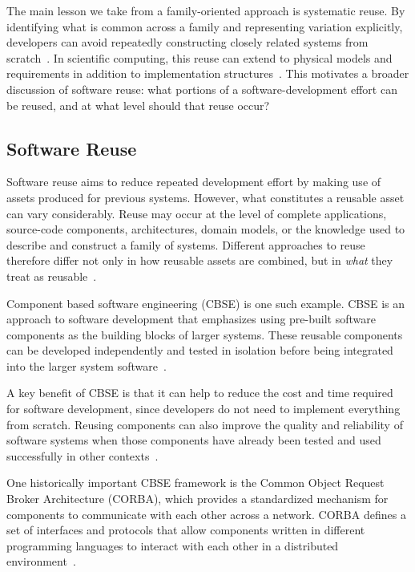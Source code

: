 The main lesson we take from a family-oriented approach is systematic reuse.
By identifying what is common across a family and
representing variation explicitly, developers can avoid repeatedly
constructing closely related systems from scratch~\citep{Pohl2005,Weiss1998}. In
scientific computing, this reuse can extend to physical models and requirements 
in addition to implementation 
structures~\citep{SmithMcCutchanAndCao2007,SmithEtAl2008}. This motivates a
broader discussion of software reuse: what portions of a software-development 
effort can be reused, and at what level should that reuse occur?

\subsection{Software Reuse}
\label{sec:bg_software_reuse}

Software reuse aims to reduce repeated development effort by making use of
assets produced for previous systems. However, what constitutes a reusable 
asset can vary considerably. Reuse may occur at the level of complete
applications, source-code components, architectures, domain models, or the
knowledge used to describe and construct a family of systems. Different
approaches to reuse therefore differ not only in how reusable assets are
combined, but in \emph{what} they treat as 
reusable~\citep{Pohl2005,Kang1990,Czarnecki2000}.

Component based software engineering (CBSE) is one such example. CBSE is an 
approach to software development that emphasizes using pre-built software 
components as the building blocks of larger systems. These reusable components 
can be developed independently and tested in isolation before being integrated 
into the larger system software~\citep{BassEtAl2000,Wu2001}.

A key benefit of CBSE is that it can help to reduce the cost and time required
for software development, since developers do not need to implement everything
from scratch. Reusing components can also improve the quality and reliability of
software systems when those components have already been tested and used
successfully in other contexts~\citep{BassEtAl2000}.

One historically important CBSE framework is the Common Object Request Broker Architecture (CORBA),
which provides a standardized mechanism for components to 
communicate with each other across a network. CORBA defines a set of interfaces 
and protocols that allow components written in different programming languages 
to interact with each other in a distributed environment~\citep{OMG2001}.

